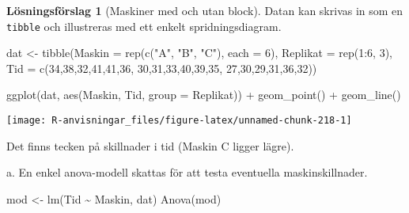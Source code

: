 \documentclass[
]{book}
\newenvironment{Shaded}{\begin{snugshade}}{\end{snugshade}}
\newcommand{\AttributeTok}[1]{\textcolor[rgb]{0.77,0.63,0.00}{#1}}
\newcommand{\DecValTok}[1]{\textcolor[rgb]{0.00,0.00,0.81}{#1}}
\newcommand{\FunctionTok}[1]{\textcolor[rgb]{0.00,0.00,0.00}{#1}}
\newcommand{\NormalTok}[1]{#1}
\newcommand{\OtherTok}[1]{\textcolor[rgb]{0.56,0.35,0.01}{#1}}
\newcommand{\SpecialCharTok}[1]{\textcolor[rgb]{0.00,0.00,0.00}{#1}}
\newcommand{\StringTok}[1]{\textcolor[rgb]{0.31,0.60,0.02}{#1}}
\theoremstyle{definition}
\theoremstyle{definition}
\theoremstyle{definition}
\theoremstyle{definition}
\newtheorem{hypothesis}{Lösningsförslag}[chapter]
\theoremstyle{remark}
\begin{document}
\begin{hypothesis}[Maskiner med och utan block]
Datan kan skrivas in som en \texttt{tibble} och illustreras med ett enkelt spridningsdiagram.

\begin{Shaded}
\begin{Highlighting}[]
\NormalTok{dat }\OtherTok{\textless{}{-}} \FunctionTok{tibble}\NormalTok{(}\AttributeTok{Maskin =} \FunctionTok{rep}\NormalTok{(}\FunctionTok{c}\NormalTok{(}\StringTok{"A"}\NormalTok{, }\StringTok{"B"}\NormalTok{, }\StringTok{"C"}\NormalTok{), }\AttributeTok{each =} \DecValTok{6}\NormalTok{),}
              \AttributeTok{Replikat =} \FunctionTok{rep}\NormalTok{(}\DecValTok{1}\SpecialCharTok{:}\DecValTok{6}\NormalTok{, }\DecValTok{3}\NormalTok{),}
              \AttributeTok{Tid =} \FunctionTok{c}\NormalTok{(}\DecValTok{34}\NormalTok{,}\DecValTok{38}\NormalTok{,}\DecValTok{32}\NormalTok{,}\DecValTok{41}\NormalTok{,}\DecValTok{41}\NormalTok{,}\DecValTok{36}\NormalTok{,}
                      \DecValTok{30}\NormalTok{,}\DecValTok{31}\NormalTok{,}\DecValTok{33}\NormalTok{,}\DecValTok{40}\NormalTok{,}\DecValTok{39}\NormalTok{,}\DecValTok{35}\NormalTok{,}
                      \DecValTok{27}\NormalTok{,}\DecValTok{30}\NormalTok{,}\DecValTok{29}\NormalTok{,}\DecValTok{31}\NormalTok{,}\DecValTok{36}\NormalTok{,}\DecValTok{32}\NormalTok{))}

\FunctionTok{ggplot}\NormalTok{(dat, }\FunctionTok{aes}\NormalTok{(Maskin, Tid, }\AttributeTok{group =}\NormalTok{ Replikat)) }\SpecialCharTok{+}
  \FunctionTok{geom\_point}\NormalTok{() }\SpecialCharTok{+}
  \FunctionTok{geom\_line}\NormalTok{()}
\end{Highlighting}
\end{Shaded}

\begin{center}\texttt{[image: R-anvisningar\_files/figure-latex/unnamed-chunk-218-1]} \end{center}

Det finns tecken på skillnader i tid (Maskin C ligger lägre).

a. En enkel anova-modell skattas för att testa eventuella maskinskillnader.

\begin{Shaded}
\begin{Highlighting}[]
\NormalTok{mod }\OtherTok{\textless{}{-}} \FunctionTok{lm}\NormalTok{(Tid }\SpecialCharTok{\textasciitilde{}}\NormalTok{ Maskin, dat)}
\FunctionTok{Anova}\NormalTok{(mod)}
\end{Highlighting}
\end{Shaded}


\end{hypothesis}
\end{document}
